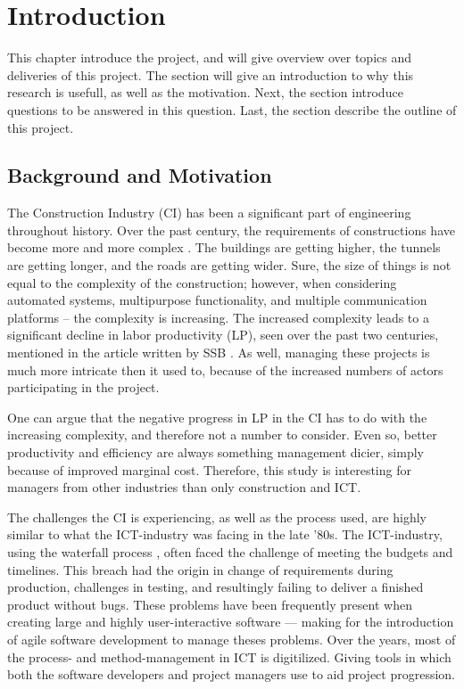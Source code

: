 \chapter{Introduction}

This chapter introduce the project, and will give overview over topics and deliveries of this project. The  section will give an introduction to why this research is usefull, as well as the motivation. Next, the  section introduce questions to be answered in this question. Last, the  section describe the outline of this project.

\section{Background and Motivation} \label{sec:background}
The Construction Industry (CI) has been a significant part of engineering throughout history. Over the past century, the requirements of constructions have become more and more complex \cite{wood2009factors}. The buildings are getting higher, the tunnels are getting longer, and the roads are getting wider. Sure, the size of things is not equal to the complexity of the construction; however, when considering automated systems, multipurpose functionality, and multiple communication platforms – the complexity is increasing. The increased complexity leads to a significant decline in labor productivity (LP), seen over the past two centuries, mentioned in the article written by SSB \cite{productivity}. As well, managing these projects is much more intricate then it used to, because of the increased numbers of actors participating in the project. 

One can argue that the negative progress in LP in the CI has to do with the increasing complexity, and therefore not a number to consider. Even so, better productivity and efficiency are always something management dicier, simply because of improved marginal cost. Therefore, this study is interesting for managers from other industries than only construction and ICT.

The challenges the CI is experiencing, as well as the process used, are highly similar to what the ICT-industry was facing in the late '80s. The ICT-industry, using the waterfall process \cite{royce}, often faced the challenge of meeting the budgets and timelines. This breach had the origin in change of requirements during production, challenges in testing, and resultingly failing to deliver a finished product without bugs. These problems have been frequently present when creating large and highly user-interactive software — making for the introduction of agile software development to manage theses problems. Over the years, most of the process- and method-management in ICT is digitilized. Giving tools in which both the software developers and project managers use to aid project progression.  

